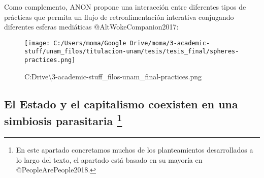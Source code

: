 \documentclass[
]{article}
\begin{document}
Como complemento, ANON propone una interacción entre diferentes tipos de
prácticas que permita un flujo de retroalimentación interativa
conjugando diferentes esferas mediáticas @AltWokeCompanion2017:

\begin{figure}
\centering
\texttt{[image: C:/Users/moma/Google Drive/moma/3-academic-stuff/unam\_filos/titulacion-unam/tesis/tesis\_final/spheres-practices.png]}
\caption{C:\Users\moma\Google Drive\moma\textbackslash3-academic-stuff\unam\_filos\titulacion-unam\tesis\tesis\_final\spheres-practices.png}
\end{figure}

\hypertarget{el-estado-y-el-capitalismo-coexisten-en-una-simbiosis-parasitaria}{%
\subsection[El Estado y el capitalismo coexisten en una simbiosis
parasitaria ]{\texorpdfstring{El Estado y el capitalismo coexisten en
una simbiosis parasitaria \footnote{En este apartado concretamos muchos
  de los planteamientos desarrollados a lo largo del texto, el apartado
  está basado en su mayoría en @PeopleArePeople2018.}}{El Estado y el capitalismo coexisten en una simbiosis parasitaria }}\label{el-estado-y-el-capitalismo-coexisten-en-una-simbiosis-parasitaria}}
\end{document}
